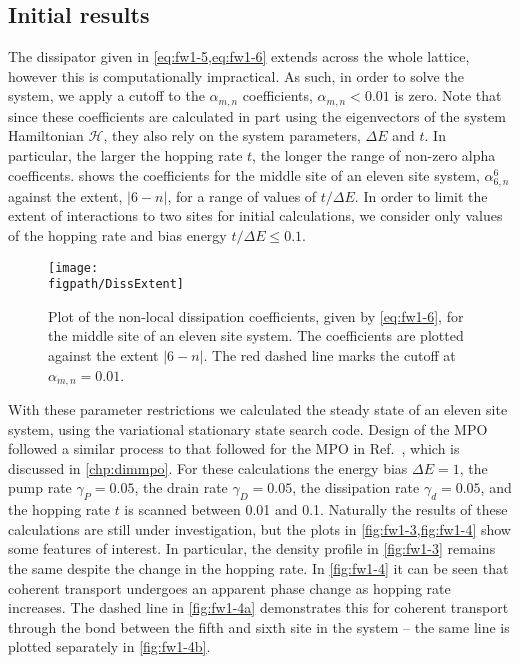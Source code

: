 \subsection{Initial results}
The dissipator given in \cref{eq:fw1-5,eq:fw1-6} extends across the whole lattice, however this is computationally impractical. As such, in order to solve the system, we apply a cutoff to the \(\alpha_{m,n}\) coefficients, \(\alpha_{m,n} < 0.01\) is zero. Note that since these coefficients are calculated in part using the eigenvectors of the system Hamiltonian \(\mathcal{H}\), they also rely on the system parameters, \(\Delta E\) and \(t\). In particular, the larger the hopping rate \(t\), the longer the range of non-zero alpha coefficents.  shows the coefficients for the middle site of an eleven site system, \(\alpha_{6,n}^{6}\) against the extent, \(|6-n|\), for a range of values of \( t / \Delta E\). In order to limit the extent of interactions to two sites for initial calculations, we consider only values of the hopping rate and bias energy \(t / \Delta E \leq 0.1\). 

\begin{figure}[ht!]
	\centering
	\texttt{[image: \\figpath/DissExtent]}
	\caption{\label{fig:fw1-2}Plot of the non-local dissipation coefficients, given by \cref{eq:fw1-6}, for the middle site of an eleven site system. The coefficients are plotted against the extent \(|6-n|\). The red dashed line marks the cutoff at \(\alpha_{m,n} = 0.01\).}
\end{figure}

With these parameter restrictions we calculated the steady state of an eleven site system, using the variational stationary state search code. Design of the MPO followed a similar process to that followed for the MPO in Ref.~\cite{Owen2017}, which is discussed in \cref{chp:dimmpo}. For these calculations the energy bias \(\Delta E = 1\), the pump rate \(\gamma_{P} = 0.05\), the drain rate \(\gamma_{D} = 0.05\), the dissipation rate \(\gamma_{d} = 0.05\), and the hopping rate \(t\) is scanned between 0.01 and 0.1. Naturally the results of these calculations are still under investigation, but the plots in \cref{fig:fw1-3,fig:fw1-4} show some features of interest. In particular, the density profile in \cref{fig:fw1-3} remains the same despite the change in the hopping rate. In \cref{fig:fw1-4} it can be seen that coherent transport undergoes an apparent phase change as hopping rate increases. The dashed line in \cref{fig:fw1-4a} demonstrates this for coherent transport through the bond between the fifth and sixth site in the system -- the same line is plotted separately in \cref{fig:fw1-4b}.
 

